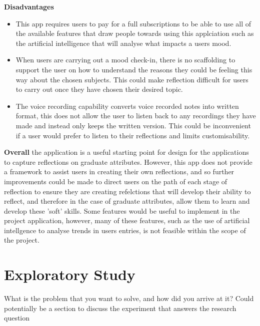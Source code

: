 \documentclass{l4proj}
\begin{document}
\textbf{Disadvantages}
\begin{itemize}
    \item This app requires users to pay for a full subscriptions to be able to use all of the available features that draw people towards using this applciation
    such as the artificial intelligence that will analyse what impacts a users mood. 
    \item When users are carrying out a mood check-in, there is no scaffolding to support the user on how to understand the reasons they could be feeling 
    this way about the chosen subjects. This could make reflection difficult for users to carry out once they have chosen their desired topic.
    \item The voice recording capability converts voice recorded notes into written format, this does not allow the user to listen back to any recordings they 
    have made and instead only keeps the written version. This could be inconvenient if a user would prefer to listen to their reflections and limits customisability.
\end{itemize}

\textbf{Overall} the application is a useful starting point for design for the applications to capture reflections on graduate attributes. However, this app
does not provide a framework to assist users in creating their own reflections, and so further improvements could be made to direct users on the path
of each stage of reflection to ensure they are creating refelctions that will develop their ability to reflect, and therefore in the case of graduate attributes,
allow them to learn and develop these 'soft' skills. Some features would
be useful to implement in the project application, however, many of these features, such as the use of artificial intellgence to analyse trends in users
entries, is not feasible within the scope of the project.



\chapter{Exploratory Study} \label{ExploratoryStudy}
What is the problem that you want to solve, and how did you arrive at it?
Could potentially be a section to discuss the experiment that answers the research question 
\end{document}
